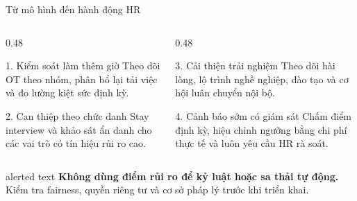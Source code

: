 \documentclass[10pt,aspectratio=169]{beamer}
\begin{document}
\begin{frame}{Từ mô hình đến hành động HR}
  \begin{columns}[T,onlytextwidth]
    \begin{column}{0.48\textwidth}
      \begin{block}{1. Kiểm soát làm thêm giờ}
        \small Theo dõi OT theo nhóm, phân bổ lại tải việc và đo lường
        kiệt sức định kỳ.
      \end{block}
      \vspace{0.12cm}
      \begin{block}{2. Can thiệp theo chức danh}
        \small Stay interview và khảo sát ẩn danh cho các vai trò có
        tín hiệu rủi ro cao.
      \end{block}
    \end{column}
    \begin{column}{0.48\textwidth}
      \begin{block}{3. Cải thiện trải nghiệm}
        \small Theo dõi hài lòng, lộ trình nghề nghiệp, đào tạo và cơ hội
        luân chuyển nội bộ.
      \end{block}
      \vspace{0.12cm}
      \begin{block}{4. Cảnh báo sớm có giám sát}
        \small Chấm điểm định kỳ, hiệu chỉnh ngưỡng bằng chi phí thực tế
        và luôn yêu cầu HR rà soát.
      \end{block}
    \end{column}
  \end{columns}
  \vspace{0.15cm}
  \begin{beamercolorbox}[sep=0.15cm,rounded=true]{alerted text}
    \centering\small
    \textbf{Không dùng điểm rủi ro để kỷ luật hoặc sa thải tự động.}
    Kiểm tra fairness, quyền riêng tư và cơ sở pháp lý trước khi triển khai.
  \end{beamercolorbox}
\end{frame}
\end{document}
